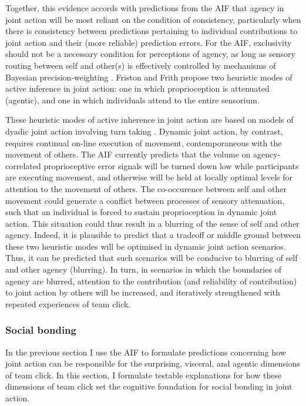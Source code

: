 \begin{CJK}{UTF8}{gbsn}
Together, this evidence accords with predictions from the AIF that agency in joint action will be most reliant on the condition of consistency, particularly when there is consistency between predictions pertaining to individual contributions to joint action and their (more reliable) prediction errors.  For the AIF, exclusivity should not be a necessary condition for perceptions of agency, as long as sensory routing between self and other(s) is effectively controlled by mechanisms of Bayesian precision-weighting \citep{Pesquita2017}.  Friston and Frith propose two heuristic modes of active inference in joint action: one in which proprioception is attenuated (agentic), and one in which individuals attend to the entire sensorium.

These heuristic modes of active inherence in joint action are based on models of dyadic joint action involving turn taking \citep[i.e., in bird song exchanges][]{Friston2015}.  Dynamic joint action, by contrast, requires continual on-line execution of movement, contemporaneous with the movement of others.  The AIF currently predicts that the volume on agency-correlated proprioceptive error signals will be turned down low while participants are executing movement, and otherwise will be held at locally optimal levels for attention to the movement of others.  The co-occurence between self and other movement could generate a conflict between processes of sensory attenuation, such that an individual is forced to sustain proprioception in dynamic joint action. This situation could  thus result in a blurring of the sense of self and other agency.  Indeed, it is plausible to predict that a tradeoff or middle ground between these two heuristic modes will be optimised in dynamic joint action scenarios. Thus, it can be predicted that such scenarios will be conducive to blurring of self and other agency (blurring).  In turn, in scenarios in which the boundaries of agency are blurred, attention to the contribution (and reliability of contribution) to joint action by others will be increased, and iteratively strengthened with repeated experiences of team click.


\subsubsection{Social bonding}
In the previous section I use the AIF to formulate predictions concerning how joint action can be responsible for the surprising, visceral, and agentic dimensions of team click.  In this section, I formulate testable explanations for how these dimensions of team click set the cognitive foundation for social bonding in joint action.


\end{CJK}
